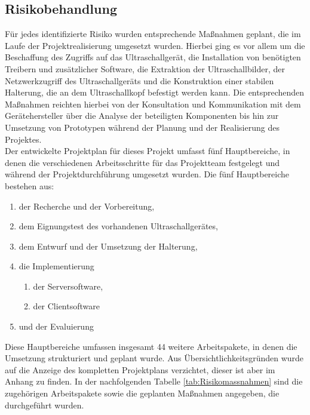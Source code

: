 \subsection{Risikobehandlung}
Für jedes identifizierte Risiko wurden entsprechende Maßnahmen geplant, die im Laufe der Projektrealisierung umgesetzt wurden. Hierbei ging es vor allem um die Beschaffung des Zugriffs auf das Ultraschallgerät, die Installation von benötigten Treibern und zusätzlicher Software, die Extraktion der Ultraschallbilder, der Netzwerkzugriff des Ultraschallgeräts und die Konstruktion einer stabilen Halterung, die an dem Ultraschallkopf befestigt werden kann. Die entsprechenden Maßnahmen reichten hierbei von der Konsultation und Kommunikation mit dem Gerätehersteller über die Analyse der beteiligten Komponenten bis hin zur Umsetzung von Prototypen während der Planung und der Realisierung des Projektes. \\ 
Der entwickelte Projektplan für dieses Projekt umfasst fünf Hauptbereiche, in denen die verschiedenen Arbeitsschritte für das Projektteam festgelegt  und während der Projektdurchführung umgesetzt wurden. Die fünf Hauptbereiche bestehen aus: 
\begin{enumerate}
\item der Recherche und der Vorbereitung,
\item dem Eignungstest des vorhandenen Ultraschallgerätes,
\item dem Entwurf und der Umsetzung der Halterung,
\item die Implementierung 
	\begin{enumerate}
         \item der Serversoftware,
         \item der Clientsoftware
	\end{enumerate}
\item und der Evaluierung
\end{enumerate}

Diese Hauptbereiche umfassen insgesamt 44 weitere Arbeitspakete, in denen die Umsetzung strukturiert und geplant wurde. Aus Übersichtlichkeitsgründen wurde auf die Anzeige des kompletten Projektplans verzichtet, dieser ist aber im Anhang zu finden. In der nachfolgenden Tabelle \ref{tab:Risikomassnahmen} sind die zugehörigen Arbeitspakete sowie die geplanten Maßnahmen angegeben, die durchgeführt wurden.

